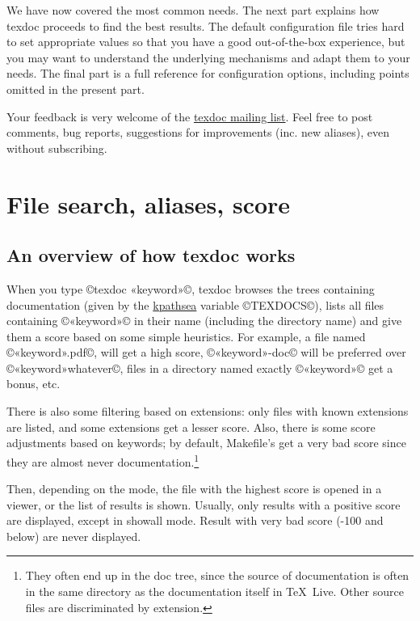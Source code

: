 \documentclass[a4paper, oneside]{scrartcl}
\makeatletter
\newcommand\texdoc{texdoc\xspace}
\newcommand\tdml{\href{mailto:texdoc@tug.org}{texdoc mailing list}\xspace}
\makeatother
\begin{document}
We have now covered the most common needs. The next part explains
how \texdoc proceeds to find the best results.
The default configuration file tries hard to set appropriate values so that
you have a good out-of-the-box experience, but you may want to understand the
underlying mechanisms and adapt them to your needs. The final part is a full
reference for configuration options, including points omitted in the present
part.

Your feedback is very welcome of the \tdml. Feel free to post comments, bug
reports, suggestions for improvements (inc. new aliases), even without
subscribing.

\clearpage

\section{File search, aliases, score}

\subsection{An overview of how texdoc works}

When you type ©texdoc «keyword»©, texdoc browses the trees containing
documentation (given by the \href{http://www.tug.org/kpathsea/} {kpathsea}
variable ©TEXDOCS©), lists all files containing ©«keyword»© in their name
(including the directory name) and give them a score based on some simple
heuristics. For example, a file named ©«keyword».pdf©, will get a high score,
©«keyword»-doc© will be preferred over ©«keyword»whatever©, files in a
directory named exactly ©«keyword»© get a bonus, etc.

There is also some filtering based on extensions: only files with known
extensions are listed, and some extensions get a lesser score. Also, there is
some score adjustments based on keywords; by default, Makefile's get a very
bad score since they are almost never documentation.\footnote{They often end
  up in the doc tree, since the source of documentation is often in the same
  directory as the documentation itself in \TeX\ Live. Other source files are
  discriminated by extension.}

Then, depending on the mode, the file with the highest score is opened in a
viewer, or the list of results is shown. Usually, only results with a positive
score are displayed, except in showall mode. Result with very bad score (-100
and below) are never displayed.

\medskip
\end{document}
